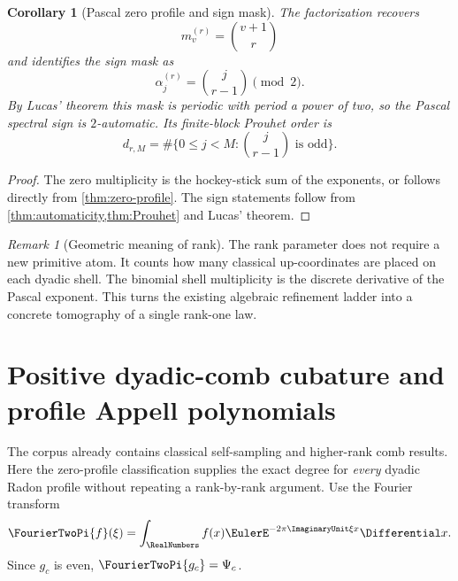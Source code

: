 \documentclass[11pt]{article}
\numberwithin{equation}{section}
\newtheorem{corollary}[theorem]{Corollary}
\theoremstyle{definition}
\theoremstyle{remark}
\newtheorem{remark}[theorem]{Remark}
\begin{document}
\begin{corollary}[Pascal zero profile and sign mask]
\label{cor:Pascal-profile-sign}
The factorization recovers
\begin{equation}
 m_v^{(r)}=\binom{v+1}{r}
\end{equation}
and identifies the sign mask as
\begin{equation}
 \alpha_j^{(r)}=\binom{j}{r-1}\pmod2.
\end{equation}
By Lucas' theorem this mask is periodic with period a power of two, so the
Pascal spectral sign is $2$-automatic.  Its finite-block Prouhet order is
\begin{equation}
 d_{r,M}=\#\{0\le j<M:\binom{j}{r-1}\text{ is odd}\}.
\end{equation}
\end{corollary}

\begin{proof}
The zero multiplicity is the hockey-stick sum of the exponents, or follows
directly from \cref{thm:zero-profile}.  The sign statements follow from
\cref{thm:automaticity,thm:Prouhet} and Lucas' theorem.
\end{proof}

\begin{remark}[Geometric meaning of rank]
The rank parameter does not require a new primitive atom.  It counts how many
classical up-coordinates are placed on each dyadic shell.  The binomial shell
multiplicity is the discrete derivative of the Pascal exponent.  This turns
the existing algebraic refinement ladder into a concrete tomography of a
single rank-one law.
\end{remark}

\section{Positive dyadic-comb cubature and profile Appell polynomials}
\label{sec:cubature}

The corpus already contains classical self-sampling and higher-rank comb
results.  Here the zero-profile classification supplies the exact degree for
\emph{every} dyadic Radon profile without repeating a rank-by-rank argument.
Use the Fourier transform
\begin{equation}
 \FourierTwoPi{f}(\xi)=\int_{\RealNumbers}f(x)\EulerE^{-2\pi\ImaginaryUnit\xi x}\Differential x.
\end{equation}
Since $g_c$ is even, $\FourierTwoPi{g_c}=\Psi_c$.
\end{document}

